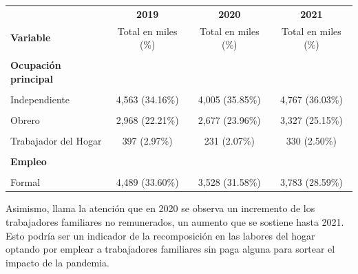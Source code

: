 \documentclass[
  letterpaper,
  12pt,
  oneside,
  spanish,
  doublespacing,
  headsepline,
  parskip]{MastersDoctoralThesis}
\begin{document}
\begin{table}[H]
\begin{tabular}{lccc}
\toprule
\multicolumn{1}{c}{ } & \multicolumn{1}{c}{\textbf{2019}} & \multicolumn{1}{c}{\textbf{2020}} & \multicolumn{1}{c}{\textbf{2021}} \\
\cmidrule(l{3pt}r{3pt}){2-2} \cmidrule(l{3pt}r{3pt}){3-3} \cmidrule(l{3pt}r{3pt}){4-4}
\textbf{Variable} & Total en miles (\%) & Total en miles (\%) & Total en miles (\%)\\
\midrule
\cellcolor{gray!6}{\textbf{Nacional}} & \cellcolor{gray!6}{13,360 (100.00\%)} & \cellcolor{gray!6}{11,172 (100.00\%)} & \cellcolor{gray!6}{13,229 (100.00\%)}\\
\textbf{Ocupación principal} &  &  & \\
\cellcolor{gray!6}{Empleador} & \cellcolor{gray!6}{570 (4.27\%)} & \cellcolor{gray!6}{345 (3.09\%)} & \cellcolor{gray!6}{465 (3.51\%)}\\
Independiente & 4,563 (34.16\%) & 4,005 (35.85\%) & 4,767 (36.03\%)\\
\cellcolor{gray!6}{Empleado} & \cellcolor{gray!6}{4,065 (30.42\%)} & \cellcolor{gray!6}{3,056 (27.35\%)} & \cellcolor{gray!6}{3,479 (26.29\%)}\\
\addlinespace
Obrero & 2,968 (22.21\%) & 2,677 (23.96\%) & 3,327 (25.15\%)\\
\cellcolor{gray!6}{Familiar No Remunerado} & \cellcolor{gray!6}{774 (5.79\%)} & \cellcolor{gray!6}{830 (7.43\%)} & \cellcolor{gray!6}{833 (6.30\%)}\\
Trabajador del Hogar & 397 (2.97\%) & 231 (2.07\%) & 330 (2.50\%)\\
\cellcolor{gray!6}{Otro} & \cellcolor{gray!6}{23 (0.18\%)} & \cellcolor{gray!6}{27 (0.24\%)} & \cellcolor{gray!6}{30 (0.22\%)}\\
\textbf{Empleo} &  &  & \\
\addlinespace
\cellcolor{gray!6}{Informal} & \cellcolor{gray!6}{8,872 (66.40\%)} & \cellcolor{gray!6}{7,643 (68.42\%)} & \cellcolor{gray!6}{9,446 (71.41\%)}\\
Formal & 4,489 (33.60\%) & 3,528 (31.58\%) & 3,783 (28.59\%)\\
\bottomrule
\end{tabular}
\endgroup{}
\end{table}

Asimismo, llama la atención que en 2020 se observa un incremento de los
trabajadores familiares no remunerados, un aumento que se sostiene hasta
2021. Esto podría ser un indicador de la recomposición en las labores
del hogar optando por emplear a trabajadores familiares sin paga alguna
para sortear el impacto de la pandemia.
\end{document}
